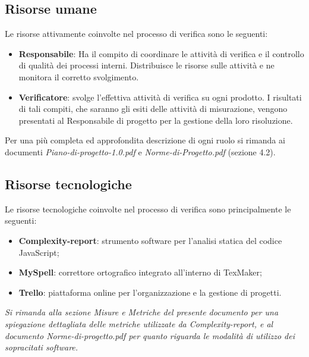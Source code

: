 \documentclass[a4paper,11pt]{article}
\begin{document}
\subsection{Risorse umane}
Le risorse attivamente coinvolte nel processo di verifica sono le seguenti: 
\begin{itemize}
\item \textbf{Responsabile}: Ha il compito di coordinare le attività di verifica e il controllo di qualità dei processi interni. Distribuisce le risorse sulle attività e ne monitora il corretto svolgimento.
\item \textbf{Verificatore}: svolge l'effettiva attività di verifica su ogni prodotto. I risultati di tali compiti, che saranno gli esiti delle attività di misurazione, vengono presentati al Responsabile di progetto per la gestione della loro risoluzione.
\end{itemize}
Per una più completa ed approfondita descrizione di ogni ruolo si rimanda ai documenti  \textit{Piano-di-progetto-1.0.pdf} e \textit{Norme-di-Progetto.pdf} (sezione 4.2).

\subsection{Risorse tecnologiche}

Le risorse tecnologiche coinvolte nel processo di verifica sono principalmente le seguenti: 
\begin{itemize}
\item \textbf{Complexity-report}: strumento software per l'analisi statica del codice JavaScript;
\item \textbf{MySpell}: correttore ortografico integrato all'interno di TexMaker;
\item \textbf{Trello}: piattaforma online per l'organizzazione e la gestione di progetti. 
\end{itemize}
\textit{Si rimanda alla sezione Misure e Metriche del presente documento per una spiegazione dettagliata delle metriche utilizzate da Complexity-report, e al documento Norme-di-progetto.pdf per quanto riguarda le modalità di utilizzo dei sopracitati software.} 
\end{document}

